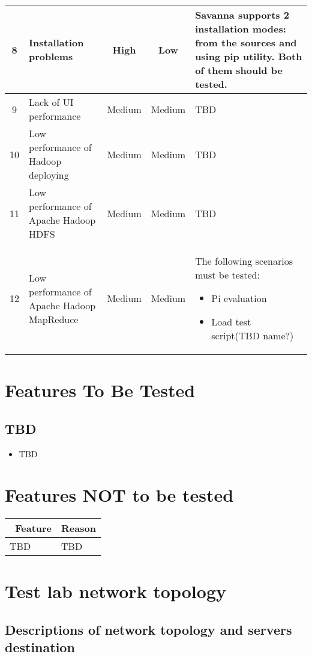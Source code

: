\documentclass[a4paper,11pt]{article}
\begin{document}
\begin{longtable}{|c|p{3cm}|c|c|p{8cm}|}
8&Installation problems& High &  Low & Savanna supports 2 installation modes: from the sources and using pip utility. Both of them should be tested.\\ \hline
9&Lack of UI performance & Medium & Medium & TBD \\ \hline
10&Low performance of Hadoop deploying & Medium & Medium & TBD\\ \hline
11&Low performance of Apache Hadoop HDFS & Medium & Medium & TBD\\ \hline
12&Low performance of Apache Hadoop MapReduce & Medium & Medium & The following scenarios must be tested:
\begin{itemize}
\item Pi evaluation
\item Load test script(TBD name?)
\end{itemize}
\\ \hline
\end{longtable}

\section{Features To Be Tested}
\subsection{TBD}
\begin{itemize}
\item TBD
\end{itemize} 

\section{Features NOT to be tested}
\begin{tabular}{|p{5cm}|p{10cm}|}
\hline
\ \bf Feature & \bf Reason \\ \hline
TBD&TBD \\ \hline
\end{tabular}


\newpage
\section{Test lab network topology}

\subsection{Descriptions of network topology and servers destination}
\end{document}
